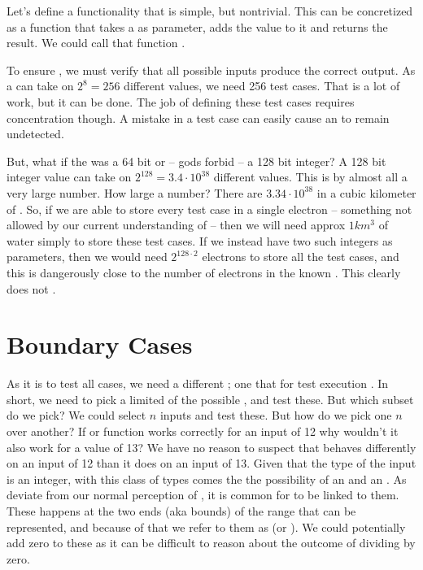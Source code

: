 Let's define a functionality that is simple, but nontrivial. This can be concretized as a function that takes a  as parameter, adds the value  to it and returns the result. We could call that function .

To ensure , we must verify that all possible inputs produce the correct output. As a  can take on $2^8=256$ different values, we need 256 test cases. That is a lot of work, but it can be done. The job of defining these test cases requires concentration though. A mistake in a test case can easily cause an  to remain undetected.

But, what if the  was a 64 bit or -- gods forbid -- a 128 bit integer? A 128 bit integer value can take on $2^{128}=3.4 \cdot 10^{38}$ different values. This is by almost all  a very large number. How large a number? There are $3.34 \cdot 10^{38}$  in a cubic kilometer of . So, if we are able to store every test case in a single electron -- something not allowed by our current understanding of  -- then we will need approx $1km^3$ of water simply to store these test cases. If we instead have two such integers as parameters, then we would need $2^{128 \cdot 2}$ electrons to store all the test cases, and this is dangerously close to the number of electrons in the known . This  clearly does not .

\section{Boundary Cases}

As it is  to test all cases, we need a different ; one that   for test execution . In short, we need to pick a limited  of the possible , and test these. But which subset do we pick? We could  select $n$ inputs and test these. But how do we pick one $n$ over another? If or  function works correctly for an input of 12 why wouldn't it also work for a value of 13? We have no reason to suspect that  behaves differently on an input of 12 than it does on an input of 13. Given that the type of the input is an integer, with this class of types comes the the possibility of an  and an . As deviate from our normal perception of , it is common for  to be linked to them. These happens at the two ends (aka bounds) of the range that can be represented, and because of that we refer to them as  (or ). We could potentially add zero to these as it can be difficult to reason about the outcome of dividing by zero.

